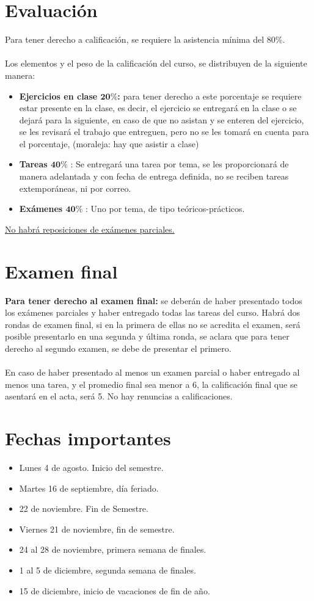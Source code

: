 \documentclass[12pt]{article}
\begin{document}
\section{Evaluación}
Para tener derecho a calificación, se requiere la asistencia mínima del 80\%.
\\
\\
Los elementos y el peso de la calificación del curso, se distribuyen de la siguiente manera:
\begin{itemize}
\item \textbf{Ejercicios en clase $\mathbf{20\%}$:} para tener derecho a este porcentaje se requiere estar presente en la clase, es decir, el ejercicio se entregará en la clase o se dejará para la siguiente, en caso de que no asistan y se enteren del ejercicio, se les revisará el trabajo que entreguen, pero no se les tomará en cuenta para el porcentaje, (moraleja: hay que asistir a clase) 
\item \textbf{Tareas $\mathbf{40\%}$} : Se entregará una tarea por tema, se les proporcionará de manera adelantada y con fecha de entrega definida, no se reciben tareas extemporáneas, ni por correo.
\item \textbf{Exámenes $\mathbf{40\%}$} : Uno por tema, de tipo teóricos-prácticos. 
\end{itemize}
\underline{No habrá reposiciones de exámenes parciales.}
\section{Examen final}
\textbf{Para tener derecho al examen final:} se deberán de haber presentado todos los exámenes parciales y haber entregado todas las tareas del curso. Habrá dos rondas de examen final, si en la primera de ellas no se acredita el examen, será posible presentarlo en una segunda y última ronda, se aclara que para tener derecho al segundo examen, se debe de presentar el primero.
\\
\\
En caso de haber presentado al menos un examen parcial o haber entregado al menos una tarea, y el promedio final sea menor a 6, la calificación final que se asentará en el acta, será 5. No hay renuncias a calificaciones.
\section{Fechas importantes}
\begin{itemize}
\item Lunes 4 de agosto. Inicio del semestre.
\item Martes 16 de septiembre, día feriado.
\item 22 de noviembre. Fin de Semestre.
\item Viernes 21 de noviembre, fin de semestre.
\item 24 al 28 de noviembre, primera semana de finales.
\item 1 al 5 de diciembre, segunda semana de finales.
\item 15 de diciembre, inicio de vacaciones de fin de año.
\end{itemize}
\end{document}
